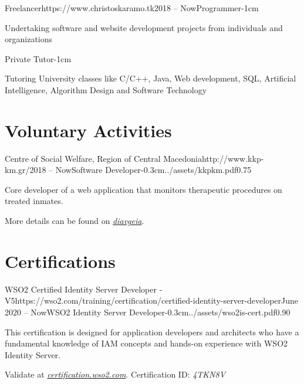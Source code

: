 \documentclass{mycv}
\begin{document}
	\begin{EntryDated}{Freelancer}{https://www.christoskaramo.tk}{2018 -- Now}{Programmer}{-1cm}
	\begin{Itemize}
		\item Undertaking software and website development projects from individuals and organizations
	\end{Itemize}
	\end{EntryDated}

	\vspace*{-1.2cm}

	\begin{EntryDated}{}{}{}{Private Tutor}{-1cm}
		\begin{Itemize}
			\item Tutoring University classes like C/C++, Java, Web development, SQL, Artificial Intelligence, Algorithm Design and Software Technology
		\end{Itemize}
	\end{EntryDated}
	
	\section{Voluntary Activities}
	\begin{EntryDatedLogo}{Centre of Social Welfare, Region of Central Macedonia}{http://www.kkp-km.gr/}{2018 -- Now}{Software Developer}{-0.3cm}{../assets/kkpkm.pdf}{0.75}
		\begin{Itemize}
			\item Core developer of a web application that monitors therapeutic procedures on treated inmates.
			\item More details can be found on \href{https://diavgeia.gov.gr/decision/view/\%CE\%A8\%CE\%A6\%CE\%A1\%CE\%93\%CE\%9F\%CE\%9E\%CE\%A7\%CE\%A3-\%CE\%A0\%CE\%93\%CE\%A6}{\textit{diavgeia}}.
		\end{Itemize}
	\end{EntryDatedLogo}

	\section{Certifications}
	\begin{EntryDatedLogo}{WSO2 Certified Identity Server
			Developer - V5}{https://wso2.com/training/certification/certified-identity-server-developer}{June 2020 -- Now}{WSO2 Identity Server Developer}{-0.3cm}{../assets/wso2is-cert.pdf}{0.90}
		\begin{Itemize}
			\item This certification is designed for application developers and architects who have a fundamental knowledge of IAM concepts and hands-on experience with WSO2 Identity Server. 
			\item Validate at \href{https://certification.wso2.com}{\textit{certification.wso2.com}}. Certification ID: \textit{4TKN8V}
		\end{Itemize}
	\end{EntryDatedLogo}
\end{document}
